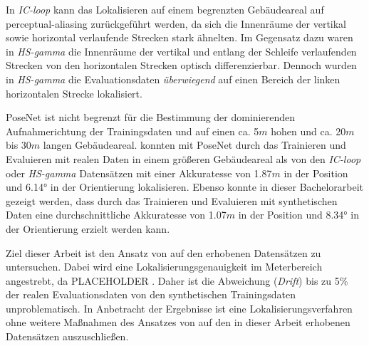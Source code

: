 In \textit{IC-loop} kann das Lokalisieren auf einem begrenzten Gebäudeareal auf perceptual-aliasing zurückgeführt werden, da sich die Innenräume der vertikal sowie horizontal verlaufende Strecken stark ähnelten. Im Gegensatz dazu waren in \textit{HS-gamma} die Innenräume der vertikal und entlang der Schleife verlaufenden Strecken von den horizontalen Strecken optisch differenzierbar. Dennoch wurden in \textit{HS-gamma} die Evaluationsdaten \textit{überwiegend} auf einen Bereich der linken horizontalen Strecke lokalisiert. 



PoseNet ist nicht begrenzt für die Bestimmung der dominierenden Aufnahmerichtung der Trainingsdaten und auf einen ca. 5$m$ hohen und ca. 20$m$ bis 30$m$ langen Gebäudeareal. \citet{walchImageBasedLocalizationUsing2017} konnten mit PoseNet durch das Trainieren und Evaluieren mit realen Daten in einem größeren Gebäudeareal als von den \textit{IC-loop} oder \textit{HS-gamma} Datensätzen mit einer Akkuratesse von 1.87$m$ in der Position und 6.14° in der Orientierung lokalisieren. Ebenso konnte in dieser Bachelorarbeit gezeigt werden, dass durch das Trainieren und Evaluieren mit synthetischen Daten eine durchschnittliche Akkuratesse von 1.07$m$ in der Position und 8.34° in der Orientierung erzielt werden kann.











Ziel dieser Arbeit ist den Ansatz von \citet{acharyaBIMPoseNetIndoorCamera2019} auf den erhobenen Datensätzen zu untersuchen. Dabei wird eine Lokalisierungsgenauigkeit im Meterbereich angestrebt, da PLACEHOLDER . Daher ist die Abweichung (\textit{Drift}) bis zu 5\% der realen Evaluationsdaten von den synthetischen Trainingsdaten unproblematisch. In Anbetracht der Ergebnisse ist eine Lokalisierungsverfahren ohne weitere Maßnahmen des Ansatzes von \citet{acharyaBIMPoseNetIndoorCamera2019} auf den in dieser Arbeit erhobenen Datensätzen auszuschließen.


